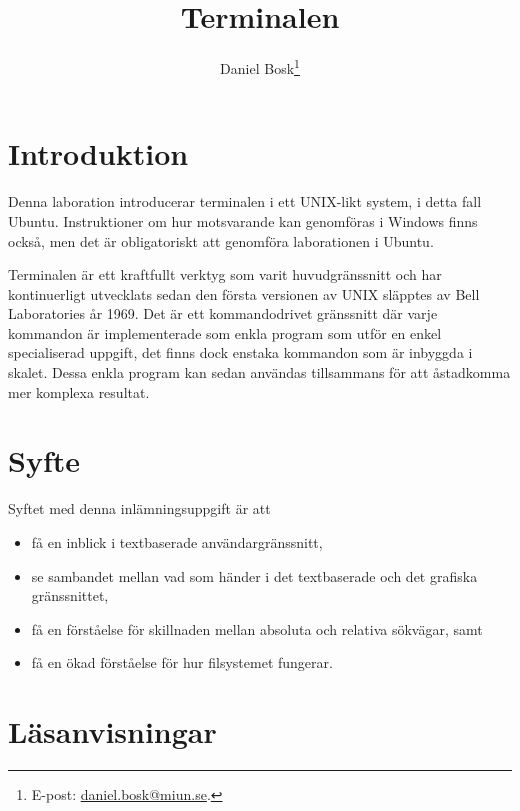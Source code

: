 \documentclass[11pt,a4paper]{miunasgn}
\title{Terminalen}
\author{Daniel Bosk\footnote{%
	E-post: \href{mailto:daniel.bosk@miun.se}{daniel.bosk@miun.se}.
}}
\date{\svnId}
\begin{document}
\maketitle
\thispagestyle{foot}
\tableofcontents


\section{Introduktion}
\label{sec:Introduktion}
\noindent
Denna laboration introducerar terminalen i ett UNIX-likt system, i detta fall 
Ubuntu.
Instruktioner om hur motsvarande kan genomföras i Windows finns också, men det 
är obligatoriskt att genomföra laborationen i Ubuntu.

Terminalen är ett kraftfullt verktyg som varit huvudgränssnitt och har 
kontinuerligt utvecklats sedan den första versionen av UNIX släpptes av Bell 
Laboratories år 1969.
Det är ett kommandodrivet gränssnitt där varje kommandon är implementerade som 
enkla program som utför en enkel specialiserad uppgift, det finns dock enstaka 
kommandon som är inbyggda i skalet.
Dessa enkla program kan sedan användas tillsammans för att åstadkomma mer 
komplexa resultat.


\section{Syfte}
\label{sec:Syfte}
\noindent
Syftet med denna inlämningsuppgift är att
\begin{itemize}
	\item få en inblick i textbaserade användargränssnitt,
	\item se sambandet mellan vad som händer i det textbaserade och det
		grafiska gränssnittet,
	\item få en förståelse för skillnaden mellan absoluta och relativa
		sökvägar, samt
	\item få en ökad förståelse för hur filsystemet fungerar.
\end{itemize}


\section{Läsanvisningar}
\label{sec:Lasanvisningar}
\noindent

\end{document}
